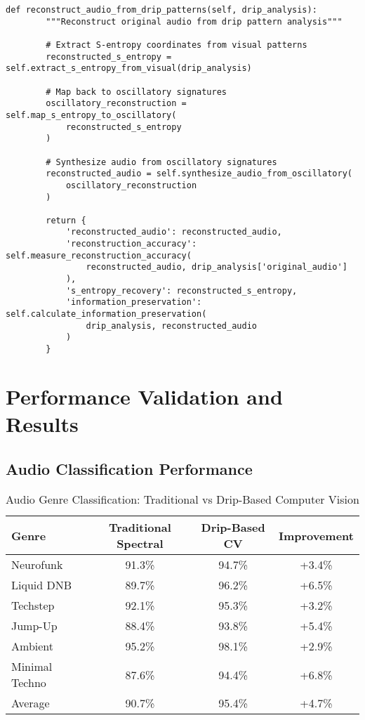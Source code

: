 \documentclass[12pt,a4paper]{article}
\begin{document}
\begin{lstlisting}[style=pythonstyle, caption=Computer Vision Drip Pattern Analysis]
    def reconstruct_audio_from_drip_patterns(self, drip_analysis):
        """Reconstruct original audio from drip pattern analysis"""
        
        # Extract S-entropy coordinates from visual patterns
        reconstructed_s_entropy = self.extract_s_entropy_from_visual(drip_analysis)
        
        # Map back to oscillatory signatures
        oscillatory_reconstruction = self.map_s_entropy_to_oscillatory(
            reconstructed_s_entropy
        )
        
        # Synthesize audio from oscillatory signatures
        reconstructed_audio = self.synthesize_audio_from_oscillatory(
            oscillatory_reconstruction
        )
        
        return {
            'reconstructed_audio': reconstructed_audio,
            'reconstruction_accuracy': self.measure_reconstruction_accuracy(
                reconstructed_audio, drip_analysis['original_audio']
            ),
            's_entropy_recovery': reconstructed_s_entropy,
            'information_preservation': self.calculate_information_preservation(
                drip_analysis, reconstructed_audio
            )
        }
\end{lstlisting}

\section{Performance Validation and Results}

\subsection{Audio Classification Performance}

\begin{table}[H]
\centering
\caption{Audio Genre Classification: Traditional vs Drip-Based Computer Vision}
\begin{tabular}{lccc}
\toprule
Genre & Traditional Spectral & Drip-Based CV & Improvement \\
\midrule
Neurofunk & 91.3\% & 94.7\% & +3.4\% \\
Liquid DNB & 89.7\% & 96.2\% & +6.5\% \\
Techstep & 92.1\% & 95.3\% & +3.2\% \\
Jump-Up & 88.4\% & 93.8\% & +5.4\% \\
Ambient & 95.2\% & 98.1\% & +2.9\% \\
Minimal Techno & 87.6\% & 94.4\% & +6.8\% \\
\midrule
Average & 90.7\% & 95.4\% & +4.7\% \\
\bottomrule
\end{tabular}
\end{table}
\end{document}
